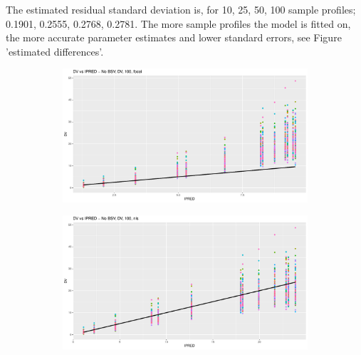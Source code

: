 The estimated residual standard deviation is, for 10, 25, 50, 100 sample profiles; 0.1901, 0.2555, 0.2768, 0.2781. The more sample profiles the model is fitted on, the more accurate parameter estimates and lower standard errors, see Figure 'estimated differences'.



\begin{figure}[htbp]
    \centering
    \begin{subfigure}[b]{0.49\linewidth}
        \centering
        \includegraphics[width=\linewidth]{fig/img/Xpose/nobsv/dv_vs_ipred_100_focei_plot.pdf}
        \caption{}
        \label{fig:}
    \end{subfigure}
    \hfill
    \begin{subfigure}[b]{0.49\linewidth}
        \centering
        \includegraphics[width=\linewidth]{fig/img/Xpose/nobsv/dv_vs_ipred_100_nls_plot.pdf}
        \caption{}
        \label{fig:}
    \end{subfigure}
    
    \vspace{1em} %


\end{figure}
